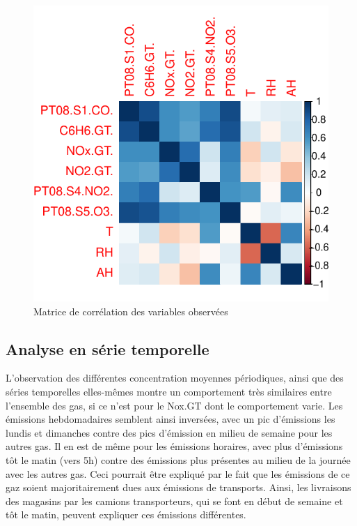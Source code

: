 \documentclass[
]{article}
\begin{document}
\begin{figure}

{\centering \includegraphics{STA202_report_files/figure-latex/figs-1} 

}

\caption{\label{fig:figs}Matrice de corrélation des variables observées}\label{fig:figs}
\end{figure}

\hypertarget{analyse-en-suxe9rie-temporelle}{%
\subsection{Analyse en série
temporelle}\label{analyse-en-suxe9rie-temporelle}}

L'observation des différentes concentration moyennes périodiques, ainsi
que des séries temporelles elles-mêmes montre un comportement très
similaires entre l'ensemble des gas, si ce n'est pour le Nox.GT dont le
comportement varie. Les émissions hebdomadaires semblent ainsi
inversées, avec un pic d'émissions les lundis et dimanches contre des
pics d'émission en milieu de semaine pour les autres gas. Il en est de
même pour les émissions horaires, avec plus d'émissions tôt le matin
(vers 5h) contre des émissions plus présentes au milieu de la journée
avec les autres gas. Ceci pourrait être expliqué par le fait que les
émissions de ce gaz soient majoritairement dues aux émissions de
transports. Ainsi, les livraisons des magasins par les camions
transporteurs, qui se font en début de semaine et tôt le matin, peuvent
expliquer ces émissions différentes.
\end{document}
